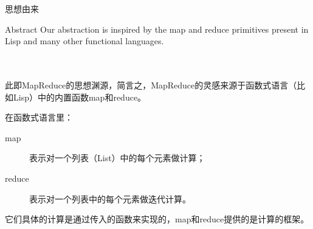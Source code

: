 \begin{frame}{\begin{CJK}{UTF8}{gkai}思想由来
	\end{CJK}}
	\begin{alertblock}{Abstract}
		Our abstraction is inspired by the map and reduce primitives present in Lisp and many other functional languages.\\
		\\
		\
		\newline\\
		
		\begin{CJK}{UTF8}{gkai}此即MapReduce的思想渊源，简言之，MapReduce的灵感来源于函数式语言（比如Lisp）中的内置函数map和reduce。\end{CJK}
	\end{alertblock}
	
	\begin{CJK}{UTF8}{gkai}在函数式语言里：
	\end{CJK}
	\begin{description}
		\item[map] \begin{CJK}{UTF8}{gkai}表示对一个列表（List）中的每个元素做计算；
		\end{CJK}
		\item[reduce] \begin{CJK}{UTF8}{gkai}表示对一个列表中的每个元素做迭代计算。
		\end{CJK}
	\end{description}
	\begin{CJK}{UTF8}{gkai}它们具体的计算是通过传入的函数来实现的，map和reduce提供的是计算的框架。
	\end{CJK}
	
\end{frame}

